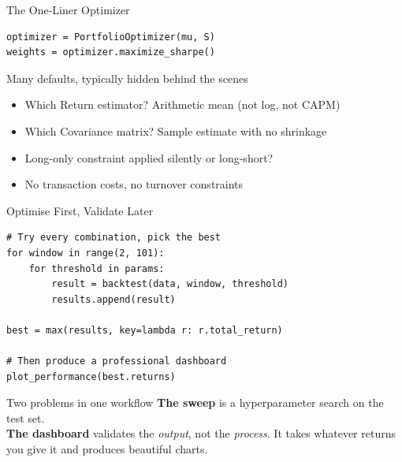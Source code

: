 \documentclass[10pt, xcolor={x11names,table},compress]{beamer}
\begin{document}
\begin{frame}[fragile]{The One-Liner Optimizer}
\begin{lstlisting}
optimizer = PortfolioOptimizer(mu, S)
weights = optimizer.maximize_sharpe()
\end{lstlisting}
\small
\vspace{2em}
\begin{bbox}{Many defaults, typically hidden behind the scenes}
\begin{itemize}\footnotesize
    \item Which Return estimator? Arithmetic mean (not log, not CAPM)
    \pause
    \item Which Covariance matrix? Sample estimate with no shrinkage
    \pause
    \item Long-only constraint applied silently or long-short?
    \pause
    \item No transaction costs, no turnover constraints
\end{itemize}
\end{bbox}
\end{frame}

\begin{frame}[fragile]{Optimise First, Validate Later}
\begin{lstlisting}
# Try every combination, pick the best
for window in range(2, 101):
    for threshold in params:
        result = backtest(data, window, threshold)
        results.append(result)
 
best = max(results, key=lambda r: r.total_return)
 
# Then produce a professional dashboard
plot_performance(best.returns)
\end{lstlisting}
\vfill
\pause
\begin{rbox}{Two problems in one workflow}
\textbf{The sweep} is a hyperparameter search on the test set.\\[0.3em]
\textbf{The dashboard} validates the \emph{output}, not the \emph{process}. It takes whatever returns you give it and produces beautiful charts.
\end{rbox}
\end{frame}
\end{document}
